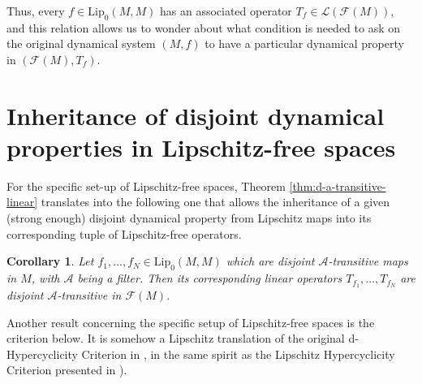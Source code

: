 \documentclass[11pt,reqno]{article}
\newtheorem{corollary}[statement]{Corollary}
\newcommand{\free}[1]{\mathcal{F}(#1)} %
\def\lip{ \text{Lip}}
\begin{document}
Thus, every $f\in \lip_0(M,M)$ has an associated operator $T_f\in \mathcal{L}(\free{M})$, and this relation allows us to wonder about what condition is needed to ask on the original dynamical system $(M,f)$ to have a particular dynamical property in $(\free{M},T_f)$.




\section{Inheritance of disjoint dynamical properties in Lipschitz-free spaces} \label{sec:disjoint-free}

For the specific set-up of Lipschitz-free spaces, Theorem \ref{thm:d-a-transitive-linear} translates into the following one that allows the inheritance of a given (strong enough) disjoint dynamical property from Lipschitz maps into its corresponding tuple of Lipschitz-free operators.

\begin{corollary}\label{cor:lip-d-hyp}
Let $f_1,...,f_N\in \lip_0(M,M)$ which are disjoint $\mathcal{A}$-transitive maps in $M$, with $\mathcal{A}$ being a filter. Then its corresponding linear operators $T_{f_1},...,T_{f_N}$ are disjoint $\mathcal{A}$-transitive in $\free{M}$.
\end{corollary}

Another result concerning the specific setup of  Lipschitz-free spaces is the criterion below. It is somehow a Lipschitz translation of the original d-Hypercyclicity Criterion in \cite{BesPeris07}, in the same spirit as the Lipschitz Hypercyclicity Criterion presented in \cite{ACP2021}). 
\end{document}
